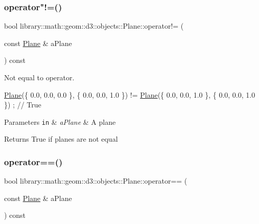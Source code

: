 \subsubsection{\texorpdfstring{operator"!=()}{operator!=()}}
{\footnotesize\ttfamily bool library\+::math\+::geom\+::d3\+::objects\+::\+Plane\+::operator!= (\begin{DoxyParamCaption}\item[{const \hyperlink{classlibrary_1_1math_1_1geom_1_1d3_1_1objects_1_1_plane}{Plane} \&}]{a\+Plane }\end{DoxyParamCaption}) const}



Not equal to operator. 


\begin{DoxyCode}
\hyperlink{classlibrary_1_1math_1_1geom_1_1d3_1_1objects_1_1_plane_a81fe78a983e2cb6ee6ad9bfabd22c3a4}{Plane}(\{ 0.0, 0.0, 0.0 \}, \{ 0.0, 0.0, 1.0 \}) != \hyperlink{classlibrary_1_1math_1_1geom_1_1d3_1_1objects_1_1_plane_a81fe78a983e2cb6ee6ad9bfabd22c3a4}{Plane}(\{ 0.0, 0.0, 1.0 \}, \{ 0.0, 0.0, 1.0 \}) ; \textcolor{comment}{//
       True}
\end{DoxyCode}



\begin{DoxyParams}[1]{Parameters}
\mbox{\tt in}  & {\em a\+Plane} & A plane \\
\hline
\end{DoxyParams}
\begin{DoxyReturn}{Returns}
True if planes are not equal 
\end{DoxyReturn}
\mbox{\label{classlibrary_1_1math_1_1geom_1_1d3_1_1objects_1_1_plane_a9391589825cac1db971b39452b38f8ea}} 
\subsubsection{\texorpdfstring{operator==()}{operator==()}}
{\footnotesize\ttfamily bool library\+::math\+::geom\+::d3\+::objects\+::\+Plane\+::operator== (\begin{DoxyParamCaption}\item[{const \hyperlink{classlibrary_1_1math_1_1geom_1_1d3_1_1objects_1_1_plane}{Plane} \&}]{a\+Plane }\end{DoxyParamCaption}) const}



